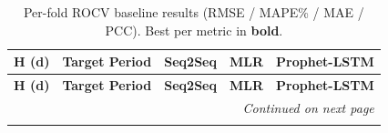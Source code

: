 
\begin{longtable}{r r l l l}
\caption{Per-fold ROCV baseline results (RMSE / MAPE\% / MAE / PCC). Best per metric in \textbf{bold}.}
\label{tab:baseline_full_results} \\

\toprule
\textbf{H (d)} & \textbf{Target Period} & \textbf{Seq2Seq} & \textbf{MLR} & \textbf{Prophet-LSTM} \\
\midrule
\endfirsthead

\toprule
\textbf{H (d)} & \textbf{Target Period} & \textbf{Seq2Seq} & \textbf{MLR} & \textbf{Prophet-LSTM} \\
\midrule
\endhead

\midrule
\multicolumn{5}{r}{\textit{Continued on next page}} \\
\endfoot

\bottomrule
\endlastfoot


\end{longtable}
